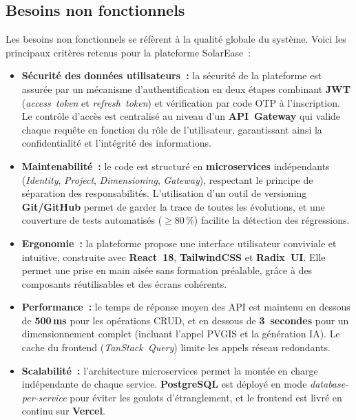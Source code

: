 \subsection{Besoins non fonctionnels}

Les besoins non fonctionnels se réfèrent à la qualité globale du système.
Voici les principaux critères retenus pour la plateforme SolarEase~:

\begin{itemize}[leftmargin=1.6em, label={--}]
  \item \textbf{Sécurité des données utilisateurs~:} la sécurité de la
    plateforme est assurée par un mécanisme d'authentification en deux
    étapes combinant \textbf{JWT} (\textit{access~token} et
    \textit{refresh~token}) et vérification par code OTP à l'inscription.
    Le contrôle d'accès est centralisé au niveau d'un \textbf{API~Gateway}
    qui valide chaque requête en fonction du rôle de l'utilisateur,
    garantissant ainsi la confidentialité et l'intégrité des informations.

  \item \textbf{Maintenabilité~:} le code est structuré en
    \textbf{microservices} indépendants (\textit{Identity}, \textit{Project},
    \textit{Dimensioning}, \textit{Gateway}), respectant le principe de
    séparation des responsabilités. L'utilisation d'un outil de versioning
    \textbf{Git/GitHub} permet de garder la trace de toutes les évolutions,
    et une couverture de tests automatisés ($\geq 80\,\%$) facilite la
    détection des régressions.

  \item \textbf{Ergonomie~:} la plateforme propose une interface
    utilisateur conviviale et intuitive, construite avec \textbf{React~18},
    \textbf{TailwindCSS} et \textbf{Radix~UI}. Elle permet une prise en
    main aisée sans formation préalable, grâce à des composants
    réutilisables et des écrans cohérents.

  \item \textbf{Performance~:} le temps de réponse moyen des API est
    maintenu en dessous de \textbf{500\,ms} pour les opérations CRUD, et
    en dessous de \textbf{3~secondes} pour un dimensionnement complet
    (incluant l'appel PVGIS et la génération IA). Le cache du frontend
    (\textit{TanStack~Query}) limite les appels réseau redondants.

  \item \textbf{Scalabilité~:} l'architecture microservices permet la
    montée en charge indépendante de chaque service. \textbf{PostgreSQL}
    est déployé en mode \textit{database-per-service} pour éviter les
    goulots d'étranglement, et le frontend est livré en continu sur
    \textbf{Vercel}.


\end{itemize}
